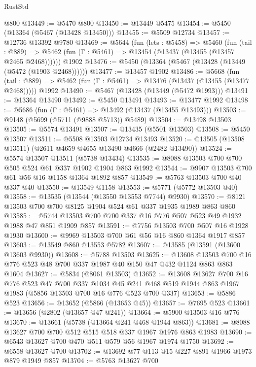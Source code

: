 \begin{lexlean}{RustStd}
\begin{coremodule}
    @800
@13449 := @5470 @800
@13450 := @13449 @5475
@13454 := @5450 (@13364 (@5467 (@13428 @13450)))
@13455 := @5509 @12734
@13457 := @12736 @13392 @9780
@13469 := @5644
    (fun (lets : @5458) =>
    @5460
      (fun (tail : @889) =>
      @5462 (fun (Γ : @5461) => @13454 (@13437 (@13455 (@13457 @2465 @2468))))))
    @1902
@13476 := @5450 (@13364 (@5467 (@13428 (@13449 (@5472 (@1903 @2468))))))
@13477 := @13457 @1902
@13486 := @5668
    (fun (tail : @889) => @5462 (fun (Γ : @5461) => @13476 (@13437 (@13455 (@13477 @2468)))))
    @1992
@13490 := @5467 (@13428 (@13449 (@5472 @1993)))
@13491 := @13364 @13490
@13492 := @5450 @13491
@13493 := @13477 @1992
@13498 := @5686 (fun (Γ : @5461) => @13492 (@13437 (@13455 @13493)))
@13503 := @9148 (@5699 (@5711 (@9888 @5713)) @5489)
@13504 := @13498 @13503
@13505 := @5574 @13491
@13507 := @13435 (@5501 @13503)
@13508 := @5450 @13507
@13511 := @5508 @13503 @12734 @13493
@13520 := @13505 (@13508 @13511) (@2611 @4659 @4655 @13490 @4666 (@2482 @13490))
@13524 := @5574 @13507 @13511 (@5738 @13434)
@13535 := @8088 @13503 @700 @700 @505 @524 @61 @337 @1902 @1904 @863 @1992
@13544 := @9907 @13503 @700 @61 @56 @16 @1158 @1364 @1892 @857
@13549 := @5763 @13503 @700 @40 @337 @40
@13550 := @13549 @1158
@13553 := @5771 (@5772 @13503 @40)
@13558 := @13535 (@13544 (@13550 @13553 @7744) @9930)
@13570 := @8121 @13503 @700 @700 @8125 @1904 @524 @61 @337 @1935 @1989 @863 @860
@13585 := @5744 @13503 @700 @700 @337 @16 @776 @507 @523 @49 @1932 @1988 @47 @851 @1909 @857
@13591 := @7756 @13503 @700 @507 @16 @1928 @1930
@13600 := @9969 @13503 @700 @61 @56 @16 @860 @1364 @1917 @857
@13603 := @13549 @860 @13553 @5782
@13607 := @13585 (@13591 (@13600 @13603 @9930))
@13608 := @5788 @13503
@13625 := @13608
    @13503
    @700
    @16
    @776
    @523
    @48
    @700
    @337
    @1987
    @40
    @150
    @47
    @432
    @1124
    @863
    @863
    @1604
@13627 := @5834 (@8061 @13503)
@13652 := @13608
    @13627
    @700
    @16
    @776
    @523
    @47
    @700
    @337
    @1034
    @45
    @241
    @468
    @519
    @1944
    @863
    @1967
    @1983
    (@5856 @13503 @700 @16 @776 @523 @700 @337)
@13653 := @5886 @523
@13656 := @13652 (@5866 (@13653 @45))
@13657 := @7695 @523
@13661 := @13656 (@2802 (@13657 @47 @241))
@13664 := @5900 @13503 @16 @776
@13670 := @13661 (@5738 (@13664 @241 @468 @1944 @863))
@13681 := @8088 @13627 @700 @700 @512 @515 @518 @337 @1967 @1976 @863 @1983
@13690 := @6543 @13627 @700 @470 @511 @579 @56 @1967 @1974 @1750
@13692 := @6558 @13627 @700
@13702 := @13692 @77 @113 @15 @227 @891 @1966 @1973 @879 @1949 @857
@13704 := @5763 @13627 @700

\end{coremodule}
\end{lexlean}
